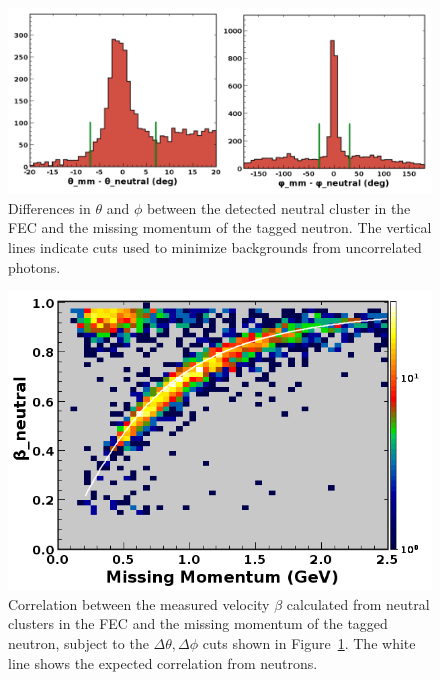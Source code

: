 \begin{figure}[hbt]
\centering
\includegraphics[width=1.0\columnwidth,keepaspectratio]{img/S10_4_1.png}
\caption[]{Differences in $\theta$ and $\phi$ between the detected neutral cluster in the FEC and the missing momentum of the tagged neutron.  The vertical lines indicate cuts used to minimize backgrounds from uncorrelated photons.}
\label{fig:S10_4_1}
\end{figure}

\begin{figure}[hbt]
\centering
\includegraphics[width=1.0\columnwidth,keepaspectratio]{img/S10_4_2.png}
\caption[]{Correlation between the measured velocity $\beta$ calculated from neutral clusters in the FEC and the missing momentum of the tagged neutron, subject to the $\Delta\theta,\Delta\phi$ cuts shown in Figure~\ref{fig:S10_4_1}.  The white line shows the expected correlation from neutrons.}
\label{fig:S10_4_2}
\end{figure}



